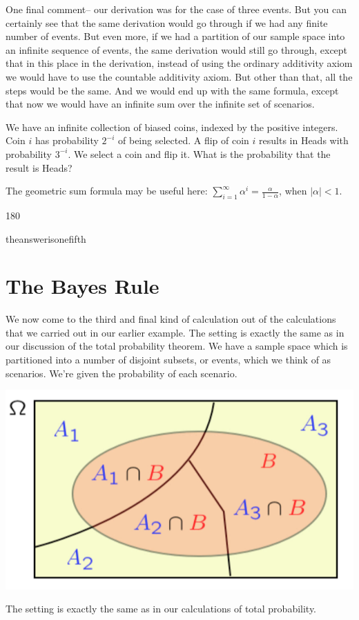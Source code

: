 \documentclass{tufte-handout}
\begin{document}
One final comment-- our derivation was for the case of three events. But you can certainly see that the
same derivation would go through if we had any finite number of events. But even more, if we had a
partition of our sample space into an infinite sequence of events, the same derivation would still go
through, except that in this place in the derivation, instead of using the ordinary additivity axiom we
would have to use the countable additivity axiom. But other than that, all the steps would be the same.
And we would end up with the same formula, except that now we would have an infinite sum over the
infinite set of scenarios.


 We have an infinite collection of biased coins, indexed 
by the positive integers. Coin $i$ has probability $2^{-i}$ of being selected. A flip of coin $i$ results in
Heads with probability $3^{-i}$. We select a coin and flip it. What is the probability that the result is Heads? 


The geometric sum formula may be useful here: $\sum_{i = 1}^{\infty} \alpha^i = \frac{\alpha}{1 - \alpha}$, 
when $|\alpha| < 1$.

\vspace{3mm}
\begin{turn}{180} 
\color{teal}
\begin{minipage}{\linewidth}
\scriptsize
theanswerisonefifth
\end{minipage}
\end{turn}




\pagebreak
\section{The Bayes Rule}\label{sec:BayesRule}

We now come to the third and final kind of calculation out of the calculations that we carried out in our
earlier example. The setting is exactly the same as in our discussion of the total probability theorem.
We have a sample space which is partitioned into a number of disjoint subsets, or events, which we think
of as scenarios. We're given the probability of each scenario.

\begin{marginfigure}
  \includegraphics{TotalProb}
  \caption{The setting is exactly the same as in our calculations of total probability.}
\end{marginfigure}
\end{document}
